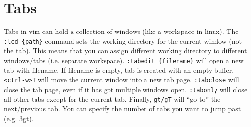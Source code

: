 \section{Tabs}

Tabs in vim can hold a collection of windows (like a workspace in  linux).
The \verb|:lcd {path}| command sets the working directory for the current window (not the tab).
This means that you can assign different working directory to different windows/tabs (i.e. separate workspace).
\verb|:tabedit {filename}| will open a new tab with filename.
If filename is empty, tab is created with an empty buffer.
\verb|<ctrl-w>T| will move the current window into a new tab page.
\verb|:tabclose| will close the tab page, even if it has got multiple windows open.
\verb|:tabonly| will close all other tabs except for the current tab.
Finally, \verb|gt/gT| will ``go to'' the next/previous tab.
You can specify the number of tabs you want to jump past (e.g. 3gt).
